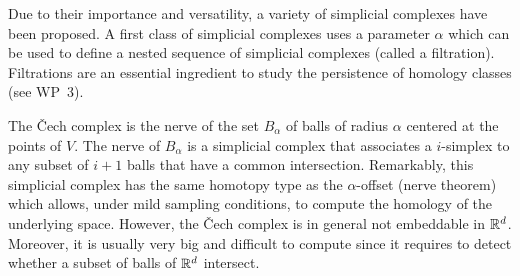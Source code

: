 %
%
%

Due to their importance and versatility, a variety of simplicial complexes have been proposed. A first class of simplicial complexes uses a parameter $\alpha$ which can be used to define a nested sequence of simplicial complexes (called a filtration). Filtrations are an essential ingredient to study the persistence of homology classes (see WP~3).

The \v{C}ech complex is the nerve of the set $B_{\alpha}$ of balls of
radius $\alpha$ centered at the points of $V$. The nerve of
$B_{\alpha}$  is a simplicial complex that associates a
$i$-simplex to any subset of $i+1$ balls that have a common
intersection. Remarkably, this simplicial
complex  has the same homotopy type as the $\alpha$-offset (nerve theorem) which allows,  under mild sampling conditions, to compute the homology of the underlying space. However,
the \v{C}ech complex is in general not embeddable in $\mathbb R ^d$. Moreover, it is usually very big and
difficult to compute since it requires to detect whether a subset of
balls of  $\mathbb R ^d$ intersect. 

